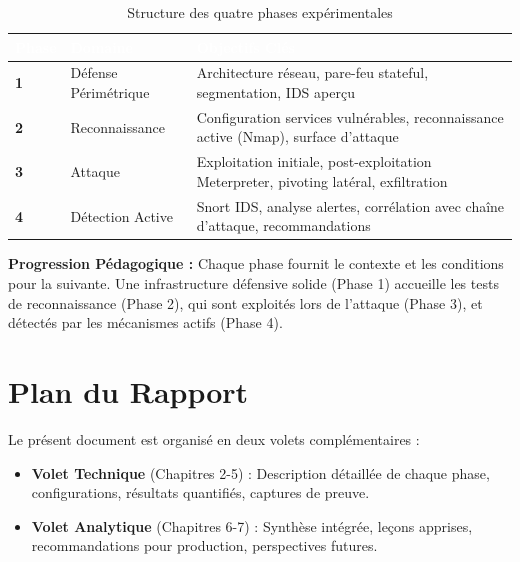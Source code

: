 \documentclass[12pt,a4paper,openany]{report}
\begin{document}
	\begin{table}[H]
		\centering
		\renewcommand{\arraystretch}{1.8}
		\setlength{\tabcolsep}{10pt}
		\setlength{\arrayrulewidth}{0.8pt}
		\begin{tabularx}{\textwidth}{|>{\centering\arraybackslash\bfseries}p{1.5cm}|p{4.2cm}|X|}
			\arrayrulecolor{tableborder}
			\hline
			\rowcolor{tableheadbg}
			\textcolor{white}{\textbf{Phase}}   &
			\textcolor{white}{\textbf{Domaine}} &
			\textcolor{white}{\textbf{Objectifs Clés}} \\
			\hline
			\rowcolor{tablerowalt}
			1 & Défense Périmétrique & Architecture réseau, pare-feu stateful, segmentation, IDS aperçu \\
			\hline
			2 & Reconnaissance       & Configuration services vulnérables, reconnaissance active (Nmap), surface d'attaque \\
			\hline
			\rowcolor{tablerowalt}
			3 & Attaque              & Exploitation initiale, post-exploitation Meterpreter, pivoting latéral, exfiltration \\
			\hline
			4 & Détection Active     & Snort IDS, analyse alertes, corrélation avec chaîne d'attaque, recommandations \\
			\hline
		\end{tabularx}
		\caption{Structure des quatre phases expérimentales}
		\label{tab:phases-overview}
	\end{table}
	
	\textbf{Progression Pédagogique :} Chaque phase fournit le contexte et les conditions pour la suivante. Une infrastructure défensive solide (Phase 1) accueille les tests de reconnaissance (Phase 2), qui sont exploités lors de l'attaque (Phase 3), et détectés par les mécanismes actifs (Phase 4).
	
	\section{Plan du Rapport}
	
	Le présent document est organisé en deux volets complémentaires :
	
	\begin{itemize}[leftmargin=*]
		\item \textbf{Volet Technique} (Chapitres 2-5) : Description détaillée de chaque phase, configurations, résultats quantifiés, captures de preuve.
		
		\item \textbf{Volet Analytique} (Chapitres 6-7) : Synthèse intégrée, leçons apprises, recommandations pour production, perspectives futures.
	\end{itemize}
	
\end{document}
